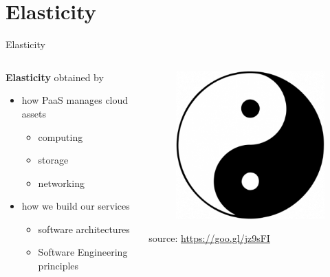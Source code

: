 %
%
\section{Elasticity}
\begin{frame}{Elasticity}
	\begin{columns}
		\begin{column}{0.7\textwidth}
			\textbf{Elasticity} obtained by
			\begin{itemize}
				\item{\footnotesize{how PaaS manages cloud assets}}
				\begin{itemize}
					\item{\scriptsize{computing}}
					\item{\scriptsize{storage}}
					\item{\scriptsize{networking}}
				\end{itemize}
				\item{\footnotesize{how we build our services}}
				\begin{itemize}
					\item{\scriptsize{software architectures}}
					\item{\scriptsize{Software Engineering principles}}
				\end{itemize}
			\end{itemize}
		\end{column}
		\begin{column}{0.3\textwidth}
			\begin{figure}
				\centering{}
				\includegraphics[scale=0.25]{images/yin-yang.png}
			\end{figure}
			\begin{flushright}
				\tiny{source: \url{https://goo.gl/jz9sFI}}
			\end{flushright}
		\end{column}
	\end{columns}
\end{frame}

